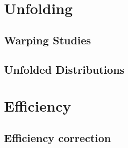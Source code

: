 
\section{Unfolding}

\subsection{Warping Studies}

\subsection{Unfolded Distributions}


\section{Efficiency}

\subsection{Efficiency correction}
